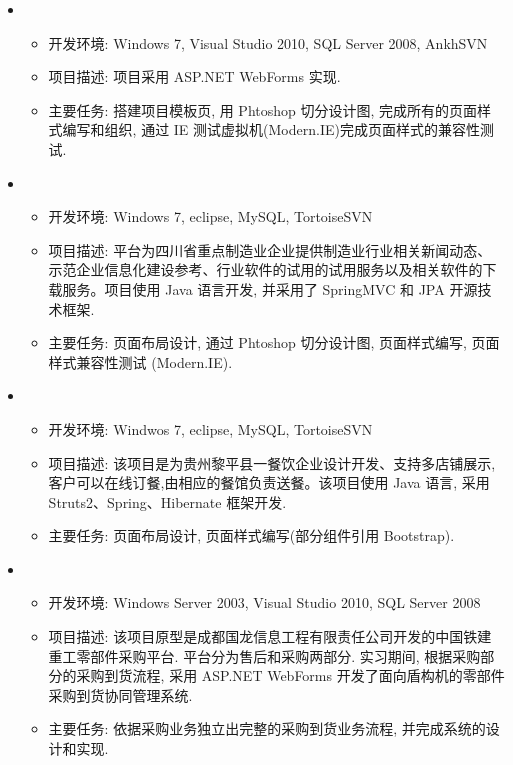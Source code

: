 \documentclass[letterpaper,11pt]{article}
\begin{document}
  \begin{itemize}
    \item
      {\footnotesize
      \begin{itemize}
        \item 开发环境: Windows 7, Visual Studio 2010, SQL Server 2008, AnkhSVN
        \item 项目描述: 项目采用 ASP.NET WebForms 实现.
        \item 主要任务: 搭建项目模板页, 用 Phtoshop 切分设计图, 完成所有的页面样式编写和组织, 通过 IE 测试虚拟机(Modern.IE)完成页面样式的兼容性测试.
      \end{itemize}
      }
    \item
      {\footnotesize
      \begin{itemize}
        \item 开发环境: Windows 7, eclipse, MySQL, TortoiseSVN
        \item 项目描述: 平台为四川省重点制造业企业提供制造业行业相关新闻动态、示范企业信息化建设参考、行业软件的试用的试用服务以及相关软件的下载服务。项目使用 Java 语言开发, 并采用了 SpringMVC 和 JPA 开源技术框架.
        \item 主要任务: 页面布局设计, 通过 Phtoshop 切分设计图, 页面样式编写, 页面样式兼容性测试 (Modern.IE).
      \end{itemize}
      }
    \item
    {\footnotesize
    \begin{itemize}
      \item 开发环境: Windwos 7, eclipse, MySQL, TortoiseSVN
      \item 项目描述: 该项目是为贵州黎平县一餐饮企业设计开发、支持多店铺展示,客户可以在线订餐,由相应的餐馆负责送餐。该项目使用 Java 语言, 采用 Struts2、Spring、Hibernate 框架开发.
      \item 主要任务: 页面布局设计, 页面样式编写(部分组件引用 Bootstrap).
    \end{itemize}
    }
    \item
    {\footnotesize
    \begin{itemize}
      \item 开发环境: Windows Server 2003, Visual Studio 2010, SQL Server 2008
      \item 项目描述: 该项目原型是成都国龙信息工程有限责任公司开发的中国铁建重工零部件采购平台. 平台分为售后和采购两部分. 实习期间, 根据采购部分的采购到货流程, 采用 ASP.NET WebForms 开发了面向盾构机的零部件采购到货协同管理系统.
      \item 主要任务: 依据采购业务独立出完整的采购到货业务流程, 并完成系统的设计和实现.
    \end{itemize}
    }
  \end{itemize}
\end{document}
